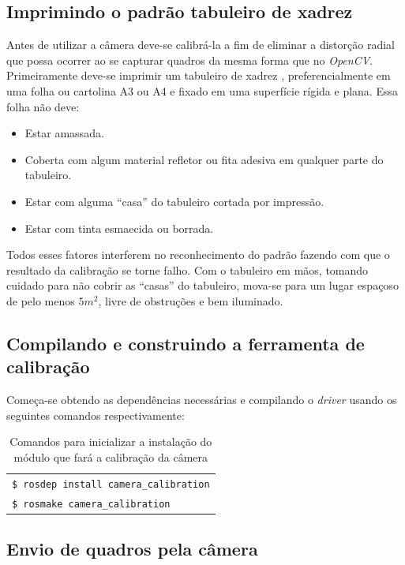 \subsection{Imprimindo o padrão tabuleiro de xadrez}

Antes de utilizar a câmera deve-se calibrá-la a fim de eliminar a distorção radial que possa ocorrer ao se capturar quadros da mesma forma que no \textit{OpenCV}.
Primeiramente deve-se imprimir um tabuleiro de xadrez \cite{Setup-CalibrateMonocularCamera}, preferencialmente em uma folha ou cartolina A3 ou A4 e fixado em uma superfície rígida e plana. Essa folha não deve: 

\begin{itemize}
	\item{Estar amassada.}
	\item{Coberta com algum material refletor ou fita adesiva em qualquer parte do tabuleiro.}
	\item{Estar com alguma “casa” do tabuleiro cortada por impressão.}
	\item{Estar com tinta esmaecida ou borrada.}
\end{itemize}	

Todos esses fatores interferem no reconhecimento do padrão fazendo com que o resultado da calibração se torne falho. Com o tabuleiro em mãos, tomando cuidado para não cobrir as “casas” do tabuleiro, mova-se para um lugar espaçoso de pelo menos $5m^2$, livre de obstruções e bem iluminado.

\subsection{Compilando e construindo a ferramenta de calibração}

Começa-se obtendo as dependências necessárias e compilando o \textit{driver} usando os seguintes comandos respectivamente:

\begin{table}[!ht]\label{tb:1}
\begin{tabular}{| p{\textwidth}|}
\hline
\texttt{\$ rosdep install camera\_calibration} \\
\texttt{\$ rosmake camera\_calibration} \\ \hline
\end{tabular}
\caption{Comandos para inicializar a instalação do módulo que fará a calibração da câmera}
\end{table}


\subsection{Envio de quadros pela câmera}

